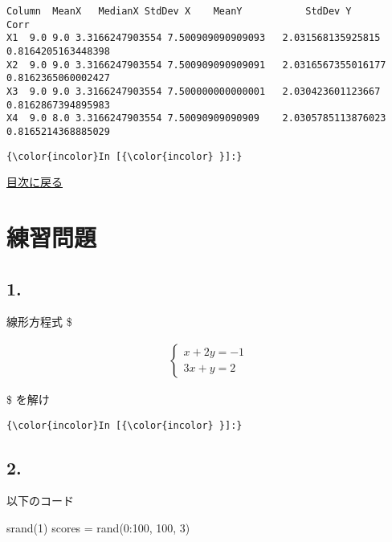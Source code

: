 \documentclass[a4paper,dvipdfmx,uplatex]{jsarticle}
\newenvironment{Shaded}{}{}
\newcommand{\FloatTok}[1]{\textcolor[rgb]{0.25,0.63,0.44}{{#1}}}
\newcommand{\NormalTok}[1]{{#1}}
\begin{document}
    \begin{Verbatim}[commandchars=\\\{\}]
Column	MeanX	MedianX	StdDev X	MeanY			StdDev Y		Corr	
X1	9.0	9.0	3.3166247903554	7.500909090909093	2.031568135925815	0.8164205163448398
X2	9.0	9.0	3.3166247903554	7.500909090909091	2.0316567355016177	0.8162365060002427
X3	9.0	9.0	3.3166247903554	7.500000000000001	2.030423601123667	0.8162867394895983
X4	9.0	8.0	3.3166247903554	7.50090909090909	2.0305785113876023	0.8165214368885029

    \end{Verbatim}

    \begin{Verbatim}[commandchars=\\\{\}]
{\color{incolor}In [{\color{incolor} }]:} 
\end{Verbatim}

    \protect\hyperlink{ux76eeux6b21}{目次に戻る}

    \section{練習問題}\label{ux7df4ux7fd2ux554fux984c}

    \subsection{1.}\label{section}

線形方程式 \$

\begin{align}
  \left\{
    \begin{array}{l}
      x + 2y = -1 \\
      3x + y = 2
    \end{array}
  \right.
\end{align}

\$ を解け

    \begin{Verbatim}[commandchars=\\\{\}]
{\color{incolor}In [{\color{incolor} }]:} 
\end{Verbatim}

    \subsection{2.}\label{section}

以下のコード

\begin{Shaded}
\begin{Highlighting}[]
    \NormalTok{srand(}\FloatTok{1}\NormalTok{)}
    \NormalTok{scores = rand(}\FloatTok{0}\NormalTok{:}\FloatTok{100}\NormalTok{, }\FloatTok{100}\NormalTok{, }\FloatTok{3}\NormalTok{)}
\end{Highlighting}
\end{Shaded}
\end{document}

